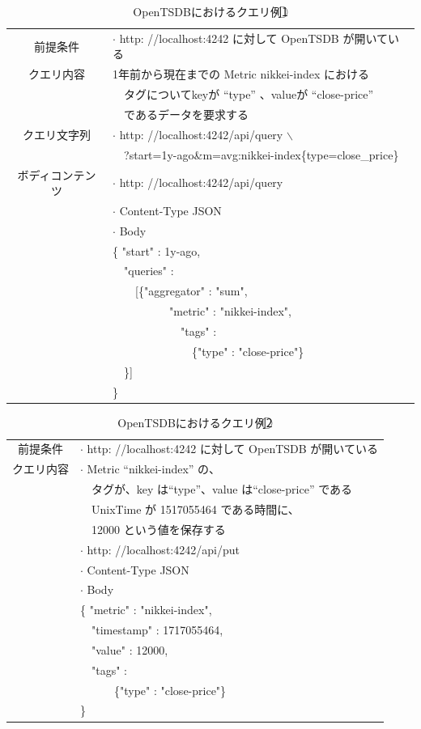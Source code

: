 \documentclass[dvipdfmx]{scrartcl}
\begin{document}
\begin{table}[htbp]
\caption{OpenTSDBにおけるクエリ例\textcircled{\scriptsize 1}}
\centering
\begin{tabular}{|c|l|}
\hline
前提条件 & \(\cdot\) http: //localhost:4242 に対して OpenTSDB が開いている\\
クエリ内容 & 1年前から現在までの Metric nikkei-index における\\
 & 　タグについてkeyが ``type'' 、valueが ``close-price''\\
 & 　であるデータを要求する\\
\hline
クエリ文字列 & \(\cdot\) http: //localhost:4242/api/query $\backslash$\\
 & 　?start=1y-ago\&m=avg:nikkei-index\{type=close\_price\}\\
\hline
ボディコンテンツ & \(\cdot\) http: //localhost:4242/api/query\\
 & \(\cdot\) Content-Type JSON\\
 & \(\cdot\) Body\\
 & \{ "start" : 1y-ago,\\
 & 　"queries" :\\
 & 　　[\{"aggregator" : "sum",\\
 & 　　　　　"metric" : "nikkei-index",\\
 & 　　　　　　"tags" :\\
 & 　　　　　　　\{"type" : "close-price"\}\\
 & 　\}]\\
 & \}\\
\hline
\end{tabular}
\end{table}

\begin{table}[htbp]
\caption{OpenTSDBにおけるクエリ例\textcircled{\scriptsize 2}}
\centering
\begin{tabular}{|c|l|}
\hline
前提条件 & \(\cdot\) http: //localhost:4242 に対して OpenTSDB が開いている\\
クエリ内容 & \(\cdot\) Metric ``nikkei-index'' の、\\
 & 　タグが、key は``type''、value は``close-price'' である\\
 & 　UnixTime が 1517055464 である時間に、\\
 & 　12000 という値を保存する\\
\hline
 & \(\cdot\) http: //localhost:4242/api/put\\
 & \(\cdot\) Content-Type JSON\\
 & \(\cdot\) Body\\
 & \{ "metric" : "nikkei-index",\\
 & 　"timestamp" : 1717055464,\\
 & 　"value" : 12000,\\
 & 　"tags" :\\
 & 　　　\{"type" : "close-price"\}\\
 & \}\\
\hline
\end{tabular}
\end{table}
\end{document}
